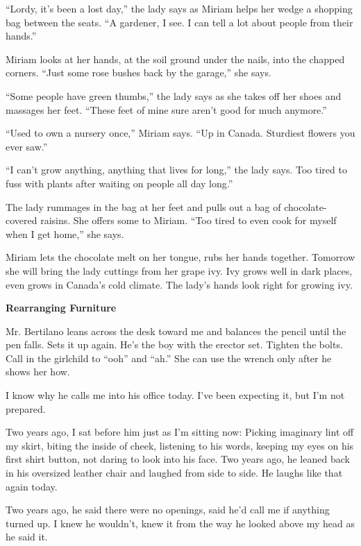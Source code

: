 \documentclass[
]{article}
\begin{document}
``Lordy, it's been a lost day,'' the lady says as Miriam helps her wedge
a shopping bag between the seats. ``A gardener, I see. I can tell a lot
about people from their hands.''

Miriam looks at her hands, at the soil ground under the nails, into the
chapped corners. ``Just some rose bushes back by the garage,'' she says.

``Some people have green thumbs,'' the lady says as she takes off her
shoes and massages her feet. ``These feet of mine sure aren't good for
much anymore.''

``Used to own a nursery once,'' Miriam says. ``Up in Canada. Sturdiest
flowers you ever saw.''

``I can't grow anything, anything that lives for long,'' the lady says.
Too tired to fuss with plants after waiting on people all day long.''

The lady rummages in the bag at her feet and pulls out a bag of
chocolate-covered raisins. She offers some to Miriam. ``Too tired to
even cook for myself when I get home,'' she says.

Miriam lets the chocolate melt on her tongue, rubs her hands together.
Tomorrow she will bring the lady cuttings from her grape ivy. Ivy grows
well in dark places, even grows in Canada's cold climate. The lady's
hands look right for growing ivy.

\textbf{\hfill\break
}

\textbf{Rearranging Furniture}

Mr. Bertilano leans across the desk toward me and balances the pencil
until the pen falls. Sets it up again. He's the boy with the erector
set. Tighten the bolts. Call in the girlchild to ``ooh'' and ``ah.'' She
can use the wrench only after he shows her how.

I know why he calls me into his office today. I've been expecting it,
but I'm not prepared.

Two years ago, I sat before him just as I'm sitting now: Picking
imaginary lint off my skirt, biting the inside of cheek, listening to
his words, keeping my eyes on his first shirt button, not daring to look
into his face. Two years ago, he leaned back in his oversized leather
chair and laughed from side to side. He laughs like that again today.

Two years ago, he said there were no openings, said he'd call me if
anything turned up. I knew he wouldn't, knew it from the way he looked
above my head as he said it.
\end{document}
